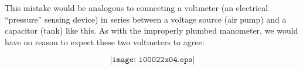 This mistake would be analogous to connecting a voltmeter (an electrical ``pressure'' sensing device) in series between a voltage source (air pump) and a capacitor (tank) like this.  As with the improperly plumbed manometer, we would have no reason to expect these two voltmeters to agree:

$$\texttt{[image: i00022x04.eps]}$$





